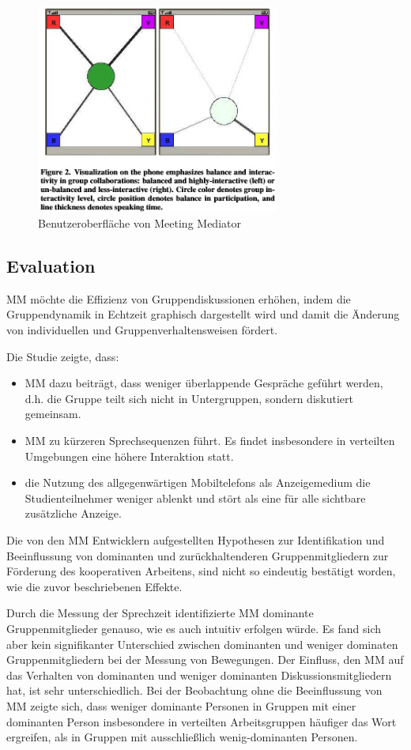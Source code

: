 \begin{figure}[htp] 
\centering 
\includegraphics[width=8cm]{mm.jpg}
\caption{Benutzeroberfläche von Meeting Mediator}
\end{figure}


\subsection{Evaluation}
MM möchte die Effizienz von Gruppendiskussionen er\-höh\-en, indem die
Gruppendynamik in Echtzeit graphisch dargestellt wird und damit die Änderung von
 individuellen und Gruppenverhaltensweisen fördert.
 
Die Studie zeigte, dass:

\begin{itemize}
  \item MM dazu beiträgt, dass weniger überlappende Gespräche geführt werden, d.h. die
Gruppe teilt sich nicht in Untergruppen, sondern diskutiert gemeinsam.
  \item MM zu kürzeren Sprechsequenzen führt. Es findet insbesondere in verteilten
Umgebungen eine höhere Interaktion statt.
  \item die Nutzung des allgegenwärtigen Mobiltelefons als Anzeigemedium die
Studienteilnehmer weniger ablenkt und stört als eine für alle sichtbare
zusätzliche Anzeige.

\end{itemize}

Die von den MM Entwicklern aufgestellten Hypothesen zur Identifikation und
Beeinflussung von dominanten und zurückhaltenderen Gruppenmitgliedern zur
Förderung des kooperativen Arbeitens, sind nicht so eindeutig bestätigt worden,
wie die zuvor beschriebenen Effekte.

Durch die Messung der Sprechzeit identifizierte MM dominante Gruppenmitglieder
genauso, wie es auch intuitiv erfolgen würde. Es fand sich aber kein
signifikanter Unterschied zwischen dominanten und weniger dominaten
Gruppenmitgliedern bei der Messung von Bewegungen.
Der Einfluss, den MM auf das Verhalten von dominanten und weniger dominanten
Diskussionsmitgliedern hat, ist sehr unterschiedlich.
Bei der Beobachtung ohne die Beeinflussung von MM zeigte sich, dass weniger
dominante Personen in Gruppen mit einer dominanten Person insbesondere in
verteilten Arbeitsgruppen häufiger das Wort ergreifen, als in Gruppen mit
ausschließlich wenig-do\-min\-ant\-en Personen.

